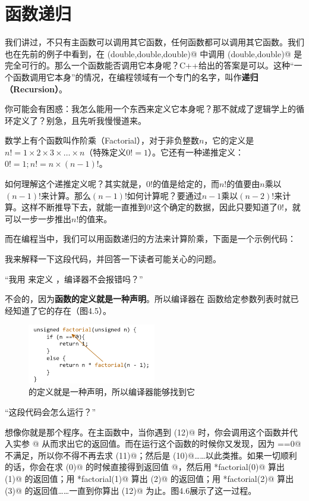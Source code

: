 \section{函数递归}
我们讲过，不只有主函数可以调用其它函数，任何函数都可以调用其它函数。我们也在先前的例子中看到，在 \lstinline@max(double,double,double)@ 中调用 \lstinline@max(double,double)@ 是完全可行的。那么一个函数能否调用它本身呢？C++给出的答案是可以。这种``一个函数调用它本身''的情况，在编程领域有一个专门的名字，叫作\textbf{递归（Recursion）}。\par
你可能会有困惑：我怎么能用一个东西来定义它本身呢？那不就成了逻辑学上的循环定义了？别急，且先听我慢慢道来。\par
数学上有个函数叫作阶乘（Factorial），对于非负整数$n$，它的定义是$n!=1\times2\times3\times\ldots\times n$（特殊定义$0!=1$）。它还有一种递推定义：$0!=1; n!=n\times(n-1)!$。\par
如何理解这个递推定义呢？其实就是，$0!$的值是给定的，而$n!$的值要由$n$乘以$(n-1)!$来计算。那么$(n-1)!$如何计算呢？要通过$n-1$乘以$(n-2)!$来计算。这样不断推导下去，就能一直推到$0!$这个确定的数据，因此只要知道了$0!$，就可以一步一步推出$n!$的值来。\par
而在编程当中，我们可以用函数递归的方法来计算阶乘，下面是一个示例代码：

我来解释一下这段代码，并回答一下读者可能关心的问题。\par
{\kaishu ``我用 \lstinline@factorial@ 来定义 \lstinline@factorial@，编译器不会报错吗？''}\par
不会的，因为\textbf{函数的定义就是一种声明}。所以编译器在 \lstinline@factorial@ 函数给定参数列表时就已经知道了它的存在（图4.5）。\par
\begin{figure}[htbp]
    \centering
    \includegraphics[width=0.5\textwidth]{../images/generalized_parts/04_factorial_code_logic.drawio.png}
    \caption{\lstinline@factorial@ 的定义就是一种声明，所以编译器能够找到它}
\end{figure}
{\kaishu ``这段代码会怎么运行？''}\par
想像你就是那个程序。在主函数中，当你遇到 \lstinline@factorial(12)@ 时，你会调用这个函数并代入实参 @ 从而求出它的返回值。而在运行这个函数的时候你又发现，因为 \lstinline@n==0@ 不满足，所以你不得不再去求 \lstinline@factorial(11)@；然后是 \lstinline@factorial(10)@……以此类推。如果一切顺利的话，你会在求 \lstinline@factorial(0)@ 的时候直接得到返回值 @，然后用 *factorial(0)@ 算出 \lstinline@factorial(1)@ 的返回值；用 *factorial(1)@ 算出 \lstinline@factorial(2)@ 的返回值；用 *factorial(2)@ 算出 \lstinline@factorial(3)@ 的返回值……一直到你算出 \lstinline@factorial(12)@ 为止。图4.6展示了这一过程。\par
